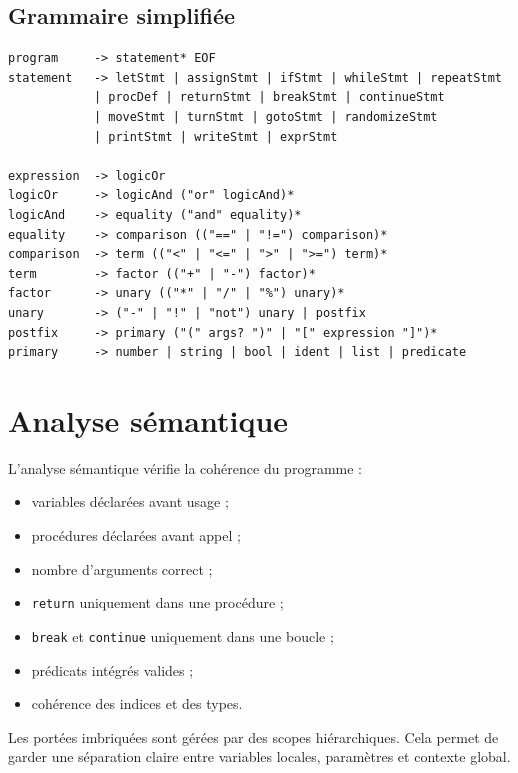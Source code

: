 \documentclass[12pt,a4paper]{article}
\begin{document}
\subsection{Grammaire simplifiée}

\begin{lstlisting}[caption={Grammaire simplifiée}]
program     -> statement* EOF
statement   -> letStmt | assignStmt | ifStmt | whileStmt | repeatStmt
            | procDef | returnStmt | breakStmt | continueStmt
            | moveStmt | turnStmt | gotoStmt | randomizeStmt
            | printStmt | writeStmt | exprStmt

expression  -> logicOr
logicOr     -> logicAnd ("or" logicAnd)*
logicAnd    -> equality ("and" equality)*
equality    -> comparison (("==" | "!=") comparison)*
comparison  -> term (("<" | "<=" | ">" | ">=") term)*
term        -> factor (("+" | "-") factor)*
factor      -> unary (("*" | "/" | "%") unary)*
unary       -> ("-" | "!" | "not") unary | postfix
postfix     -> primary ("(" args? ")" | "[" expression "]")*
primary     -> number | string | bool | ident | list | predicate
\end{lstlisting}

\section{Analyse sémantique}

L'analyse sémantique vérifie la cohérence du programme :
\begin{itemize}[nosep]
  \item variables déclarées avant usage ;
  \item procédures déclarées avant appel ;
  \item nombre d'arguments correct ;
  \item \texttt{return} uniquement dans une procédure ;
  \item \texttt{break} et \texttt{continue} uniquement dans une boucle ;
  \item prédicats intégrés valides ;
  \item cohérence des indices et des types.
\end{itemize}

\begin{futuristicbox}
Les portées imbriquées sont gérées par des scopes hiérarchiques. Cela permet de garder
une séparation claire entre variables locales, paramètres et contexte global.
\end{futuristicbox}
\end{document}
